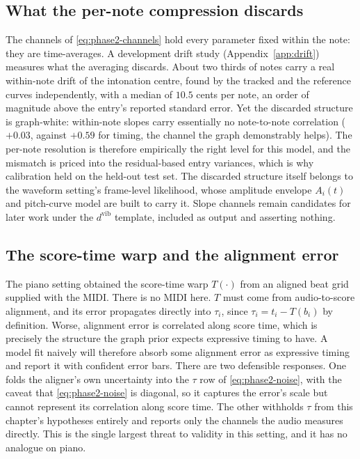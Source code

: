 \subsection{What the per-note compression discards}
The channels of \eqref{eq:phase2-channels} hold every parameter fixed
within the note: they are time-averages. A development drift study
(Appendix~\ref{app:drift}) measures what the averaging discards. About
two thirds of notes carry a real within-note drift of the intonation
centre, found by the tracked and the reference curves independently,
with a median of $10.5$ cents per note, an order of magnitude above the
entry's reported standard error. Yet the discarded structure is
graph-white: within-note slopes carry essentially no note-to-note
correlation ($+0.03$, against $+0.59$ for timing, the channel the graph
demonstrably helps). The per-note resolution is therefore empirically the
right level for this model, and the mismatch is priced into the
residual-based entry variances, which is why calibration held on the
held-out test set. The discarded structure itself belongs to the waveform
setting's frame-level likelihood, whose amplitude envelope $A_i(t)$ and
pitch-curve model are built to carry it. Slope channels remain candidates
for later work under the $d^{\mathrm{vib}}$ template, included as output
and asserting nothing.

\subsection{The score-time warp and the alignment error}
The piano setting obtained the score-time warp $T(\cdot)$ from an aligned
beat grid supplied with the MIDI. There is no MIDI here. $T$ must come
from audio-to-score alignment, and its error propagates directly into
$\tau_i$, since $\tau_i = t_i - T(b_i)$ by definition. Worse, alignment
error is correlated along score time, which is precisely the structure
the graph prior expects expressive timing to have. A model fit naively
will therefore absorb some alignment error as expressive timing and
report it with confident error bars. There are two defensible responses.
One folds the aligner's own uncertainty into the $\tau$ row of
\eqref{eq:phase2-noise}, with the caveat that \eqref{eq:phase2-noise} is
diagonal, so it captures the error's scale but cannot represent its
correlation along score time. The other withholds $\tau$ from this
chapter's hypotheses entirely and reports only the channels the audio
measures directly. This is the single largest threat to validity in this
setting, and it has no analogue on piano.

